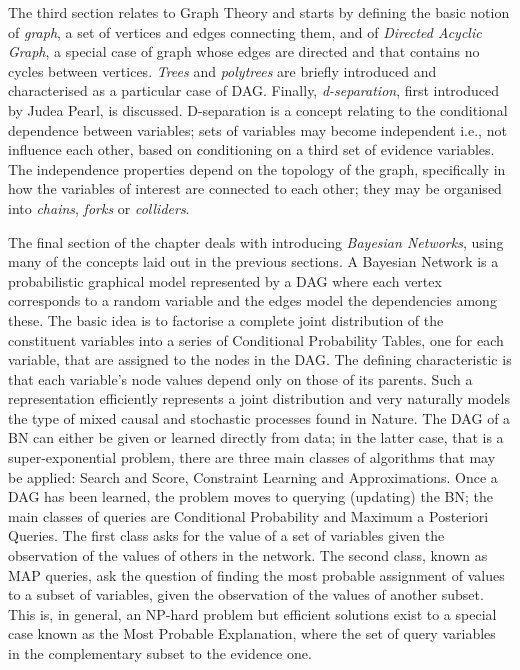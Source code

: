\documentclass[mscthesis]{usiinfthesis}
\begin{document}
The third section relates to Graph Theory and starts by defining the basic notion of \textit{graph}, a set of vertices and edges connecting them, and of \textit{Directed Acyclic Graph}, a special case of graph whose edges are directed and that contains no cycles between vertices.
\textit{Trees} and \textit{polytrees} are briefly introduced and characterised as a particular case of DAG.
Finally, \textit{d-separation}, first introduced by Judea Pearl, is discussed.
D-separation is a concept relating to the conditional dependence between variables; sets of variables may become independent i.e., not influence each other, based on conditioning on a third set of evidence variables.
The independence properties depend on the topology of the graph, specifically in how the variables of interest are connected to each other; they may be organised into \textit{chains}, \textit{forks} or \textit{colliders}.

The final section of the chapter deals with introducing \textit{Bayesian Networks}, using many of the concepts laid out in the previous sections.
A Bayesian Network is a probabilistic graphical model represented by a DAG where each vertex corresponds to a random variable and the edges model the dependencies among these.
The basic idea is to factorise a complete joint distribution of the constituent variables into a series of Conditional Probability Tables, one for each variable, that are assigned to the nodes in the DAG.
The defining characteristic is that each variable's node values depend only on those of its parents.
Such a representation efficiently represents a joint distribution and very naturally models the type of mixed causal and stochastic processes found in Nature.
The DAG of a BN can either be given or learned directly from data; in the latter case, that is a super-exponential problem, there are three main classes of algorithms that may be applied: Search and Score, Constraint Learning and Approximations.
Once a DAG has been learned, the problem moves to querying (updating) the BN; the main classes of queries are Conditional Probability and Maximum a Posteriori Queries.
The first class asks for the value of a set of variables given the observation of the values of others in the network.
The second class, known as MAP queries, ask the question of finding the most probable assignment of values to a subset of variables, given the observation of the values of another subset.
This is, in general, an NP-hard problem but efficient solutions exist to a special case known as the Most Probable Explanation, where the set of query variables in the complementary subset to the evidence one.
\end{document}
